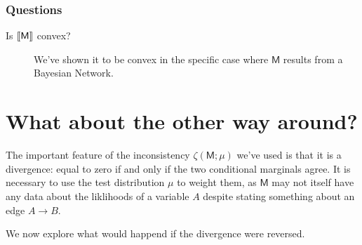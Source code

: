 \documentclass{article}
\newcommand{\bp}[1][L]{\mat{p}_{\!_#1\!}}
\newcommand{\sfM}{\mathsf M}
\begin{document}
	
	
	\subsubsection*{Questions}
	\begin{description}
		\item [Is $\bbr{\sfM}$ convex?] We've shown it to be convex in the specific case where $\sfM$ results from a Bayesian Network.

	\end{description}
	
	\section{What about the other way around?}
	The important feature of the inconsistency $\zeta(\sfM ; \mu)$ we've used is that it is a divergence: equal to zero if and only if the two conditional marginals agree. It is necessary to use the test distribution $\mu$ to weight them, as $\sfM$ may not itself have any data about the liklihoods of a variable $A$ despite stating something about an edge $A \to B$.
	
	We now explore what would happend if the divergence were reversed.
	
\end{document}
